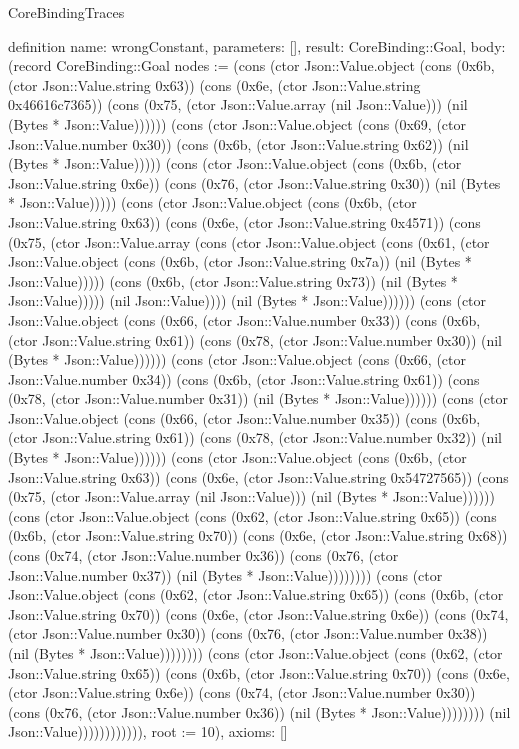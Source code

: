 \begin{lexlean}{CoreBindingTraces}
\begin{semanticmodule}
definition{
 name: wrongConstant,
 parameters: [],
 result: CoreBinding::Goal,
 body: (record CoreBinding::Goal {nodes := (cons (ctor Json::Value.object (cons (0x6b, (ctor Json::Value.string 0x63)) (cons (0x6e, (ctor Json::Value.string 0x46616c7365)) (cons (0x75, (ctor Json::Value.array (nil Json::Value))) (nil (Bytes * Json::Value)))))) (cons (ctor Json::Value.object (cons (0x69, (ctor Json::Value.number 0x30)) (cons (0x6b, (ctor Json::Value.string 0x62)) (nil (Bytes * Json::Value))))) (cons (ctor Json::Value.object (cons (0x6b, (ctor Json::Value.string 0x6e)) (cons (0x76, (ctor Json::Value.string 0x30)) (nil (Bytes * Json::Value))))) (cons (ctor Json::Value.object (cons (0x6b, (ctor Json::Value.string 0x63)) (cons (0x6e, (ctor Json::Value.string 0x4571)) (cons (0x75, (ctor Json::Value.array (cons (ctor Json::Value.object (cons (0x61, (ctor Json::Value.object (cons (0x6b, (ctor Json::Value.string 0x7a)) (nil (Bytes * Json::Value))))) (cons (0x6b, (ctor Json::Value.string 0x73)) (nil (Bytes * Json::Value))))) (nil Json::Value)))) (nil (Bytes * Json::Value)))))) (cons (ctor Json::Value.object (cons (0x66, (ctor Json::Value.number 0x33)) (cons (0x6b, (ctor Json::Value.string 0x61)) (cons (0x78, (ctor Json::Value.number 0x30)) (nil (Bytes * Json::Value)))))) (cons (ctor Json::Value.object (cons (0x66, (ctor Json::Value.number 0x34)) (cons (0x6b, (ctor Json::Value.string 0x61)) (cons (0x78, (ctor Json::Value.number 0x31)) (nil (Bytes * Json::Value)))))) (cons (ctor Json::Value.object (cons (0x66, (ctor Json::Value.number 0x35)) (cons (0x6b, (ctor Json::Value.string 0x61)) (cons (0x78, (ctor Json::Value.number 0x32)) (nil (Bytes * Json::Value)))))) (cons (ctor Json::Value.object (cons (0x6b, (ctor Json::Value.string 0x63)) (cons (0x6e, (ctor Json::Value.string 0x54727565)) (cons (0x75, (ctor Json::Value.array (nil Json::Value))) (nil (Bytes * Json::Value)))))) (cons (ctor Json::Value.object (cons (0x62, (ctor Json::Value.string 0x65)) (cons (0x6b, (ctor Json::Value.string 0x70)) (cons (0x6e, (ctor Json::Value.string 0x68)) (cons (0x74, (ctor Json::Value.number 0x36)) (cons (0x76, (ctor Json::Value.number 0x37)) (nil (Bytes * Json::Value)))))))) (cons (ctor Json::Value.object (cons (0x62, (ctor Json::Value.string 0x65)) (cons (0x6b, (ctor Json::Value.string 0x70)) (cons (0x6e, (ctor Json::Value.string 0x6e)) (cons (0x74, (ctor Json::Value.number 0x30)) (cons (0x76, (ctor Json::Value.number 0x38)) (nil (Bytes * Json::Value)))))))) (cons (ctor Json::Value.object (cons (0x62, (ctor Json::Value.string 0x65)) (cons (0x6b, (ctor Json::Value.string 0x70)) (cons (0x6e, (ctor Json::Value.string 0x6e)) (cons (0x74, (ctor Json::Value.number 0x30)) (cons (0x76, (ctor Json::Value.number 0x36)) (nil (Bytes * Json::Value)))))))) (nil Json::Value)))))))))))), root := 10}),
 axioms: []
}


\end{semanticmodule}
\end{lexlean}
